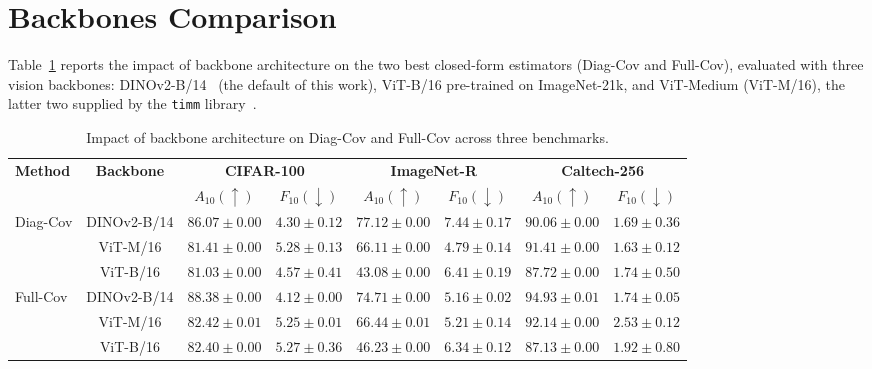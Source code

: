 \section{Backbones Comparison}
\label{sec:backbone_results}

Table~\ref{tab:multi_backbone_results} reports the impact of backbone architecture on the two best closed-form estimators (Diag-Cov and Full-Cov), evaluated with three vision backbones: DINOv2-B/14~\cite{oquab2024dinov} (the default of this work), ViT-B/16 pre-trained on ImageNet-21k, and ViT-Medium (ViT-M/16), the latter two supplied by the \texttt{timm} library~\cite{rw2019timm}.

\begin{table}[htb]
	\centering
	\caption{Impact of backbone architecture on Diag-Cov and Full-Cov across three benchmarks.}
	\label{tab:multi_backbone_results}
	\begin{adjustbox}{width=0.9\columnwidth, center}
		\small
		\setlength{\tabcolsep}{3.5pt}
		\begin{tabular}{l|c|cc|cc|cc}
			\hline
			\multirow{2}{*}{\textbf{Method}} & \multirow{2}{*}{\textbf{Backbone}} & \multicolumn{2}{c|}{\textbf{CIFAR-100}} & \multicolumn{2}{c|}{\textbf{ImageNet-R}} & \multicolumn{2}{c}{\textbf{Caltech-256}} \\
			\cline{3-8}
			& & $A_{10} (\uparrow)$ & $F_{10} (\downarrow)$ & $A_{10} (\uparrow)$ & $F_{10} (\downarrow)$ & $A_{10} (\uparrow)$ & $F_{10} (\downarrow)$ \\
			\hline
			\multirow{3}{*}{Diag-Cov}
			& DINOv2-B/14 & $86.07 \pm 0.00$ & $4.30 \pm 0.12$ & $\mathbf{77.12 \pm 0.00}$ & $7.44 \pm 0.17$ & $90.06 \pm 0.00$ & $1.69 \pm 0.36$ \\
			& ViT-M/16    & $81.41 \pm 0.00$ & $5.28 \pm 0.13$ & $66.11 \pm 0.00$ & $\mathbf{4.79 \pm 0.14}$ & $\mathbf{91.41 \pm 0.00}$ & $\mathbf{1.63 \pm 0.12}$ \\
			& ViT-B/16    & $81.03 \pm 0.00$ & $4.57 \pm 0.41$ & $43.08 \pm 0.00$ & $6.41 \pm 0.19$ & $87.72 \pm 0.00$ & $1.74 \pm 0.50$ \\
			\hline
			\multirow{3}{*}{Full-Cov}
			& DINOv2-B/14 & $\mathbf{88.38 \pm 0.00}$ & $\mathbf{4.12 \pm 0.00}$ & $74.71 \pm 0.00$ & $5.16 \pm 0.02$ & $\mathbf{94.93 \pm 0.01}$ & $1.74 \pm 0.05$ \\
			& ViT-M/16    & $82.42 \pm 0.01$ & $5.25 \pm 0.01$ & $66.44 \pm 0.01$ & $5.21 \pm 0.14$ & $92.14 \pm 0.00$ & $2.53 \pm 0.12$ \\
			& ViT-B/16    & $82.40 \pm 0.00$ & $5.27 \pm 0.36$ & $46.23 \pm 0.00$ & $6.34 \pm 0.12$ & $87.13 \pm 0.00$ & $1.92 \pm 0.80$ \\
			\hline
		\end{tabular}
	\end{adjustbox}
\end{table}

